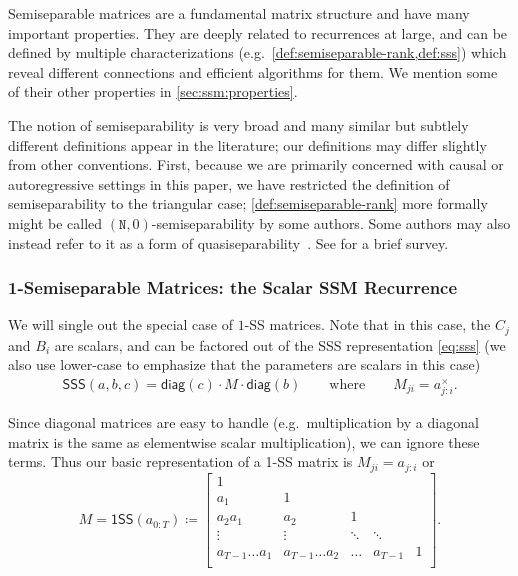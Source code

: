 Semiseparable matrices are a fundamental matrix structure and have many important properties.
They are deeply related to recurrences at large, and can be defined by multiple characterizations (e.g.\ \cref{def:semiseparable-rank,def:sss}) which reveal different connections and efficient algorithms for them.
We mention some of their other properties in \cref{sec:ssm:properties}.

\begin{remark}
  The notion of semiseparability is very broad and many similar but subtlely different definitions appear in the literature;
  our definitions may differ slightly from other conventions.
  First, because we are primarily concerned with causal or autoregressive settings in this paper,
  we have restricted the definition of semiseparability to the triangular case;
  \cref{def:semiseparable-rank} more formally might be called $(\mathtt{N},0)$-semiseparability by some authors.
  Some authors may also instead refer to it as a form of quasiseparability~\citep{eidelman1999new,pernet2016computing}.
  See \citet{vandebril2005bibliography} for a brief survey.
\end{remark}

\subsubsection{1-Semiseparable Matrices: the Scalar SSM Recurrence}
\label{sec:ssm:1-ss}

We will single out the special case of $1$-SS matrices.
Note that in this case, the $C_j$ and $B_i$ are scalars, and can be factored out of the SSS representation \eqref{eq:sss}
(we also use lower-case to emphasize that the parameters are scalars in this case)
\begin{align*}%
  \mathsf{SSS}(a, b, c) = \mathsf{diag}(c) \cdot M \cdot \mathsf{diag}(b) \qquad \text{where} \qquad M_{ji} = a_{j:i}^\times
  .
\end{align*}

Since diagonal matrices are easy to handle (e.g.\ multiplication by a diagonal matrix is the same as elementwise scalar multiplication),
we can ignore these terms.
Thus our basic representation of a 1-SS matrix is $M_{ji} = a_{j:i}$ or
\begin{equation}%
  \label{eq:1ss}
  M =
  \mathsf{1SS}(a_{0:T}) \coloneqq
  \begin{bmatrix}
    1 & \\
    a_1 & 1 & \\
    a_2a_1 & a_2 & 1 \\
    \vdots & \vdots & \ddots & \ddots \\
    a_{T-1}\dots a_1 & a_{T-1}\dots a_2 & \dots & a_{T-1} & 1 \\
  \end{bmatrix}
  .
\end{equation}

